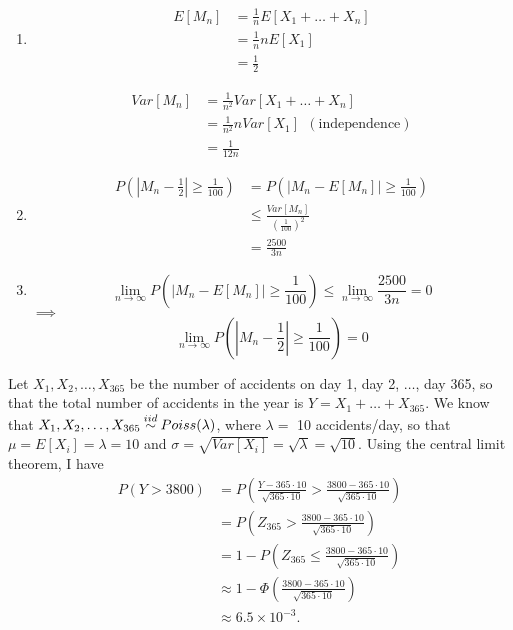 \begin{problem}{1}$ $
\begin{enumerate}
\item 
\begin{align*}
E[M_n] &= \frac{1}{n}E[X_1+\ldots+X_n] \\
& = \frac{1}{n}nE[X_1] \\
& = \frac{1}{2}
\end{align*}

\begin{align*}
Var[M_n] &= \frac{1}{n^2}Var[X_1+\ldots+X_n] \\
& = \frac{1}{n^2}nVar[X_1] ~~\mathrm{(independence)}\\
& = \frac{1}{12n}
\end{align*}

\item 
\begin{align*}
P\left(\left |M_n-\frac{1}{2} \right| \ge \frac{1}{100}\right) &= P\left( |M_n-E[M_n]| \ge \frac{1}{100}\right) \\
& \le \frac{Var[M_n]}{\left(\frac{1}{100}\right)^2} \\
& = \frac{2500}{3n}
\end{align*}

\item

\begin{equation*}
\lim_{n \rightarrow \infty} P\left( |M_n-E[M_n]| \ge \frac{1}{100}\right)\le \lim_{n \rightarrow \infty} \frac{2500}{3n} = 0
\end{equation*}
$\implies$
\begin{equation*}
\lim_{n \rightarrow \infty} P\left( \left|M_n-\frac{1}{2}\right| \ge \frac{1}{100}\right) = 0
\end{equation*}

\end{enumerate}
\end{problem}

\begin{problem}{2} Let $X_1, X_2, \ldots, X_{365}$ be the number of accidents on day 1, day 2, $\ldots$, day 365, so that the total number of accidents in the year is $Y = X_1+\ldots+X_{365}$.  We know that $X_1, X_2, \ldots, X_{365} \distas{iid} Poiss(\lambda)$, where $\lambda = $ 10 accidents/day, so that $\mu = E[X_i] = \lambda = 10$ and $\sigma = \sqrt{Var[X_i]} = \sqrt{\lambda} = \sqrt{10}$.   Using the central limit theorem, I have
\begin{align*}
P(Y>3800) & = P\left(\frac{Y-365\cdot 10}{\sqrt{365\cdot 10}}>\frac{3800-365\cdot 10}{\sqrt{365\cdot 10}} \right) \\
& = P\left(Z_{365}>\frac{3800-365\cdot 10}{\sqrt{365\cdot 10}} \right) \\
& = 1- P\left(Z_{365} \le \frac{3800-365\cdot 10}{\sqrt{365\cdot 10}} \right) \\
& \approx 1- \Phi \left( \frac{3800-365\cdot 10}{\sqrt{365\cdot 10}}\right ) \\
& \approx 6.5 \times 10^{-3}.
\end{align*}
\end{problem}

